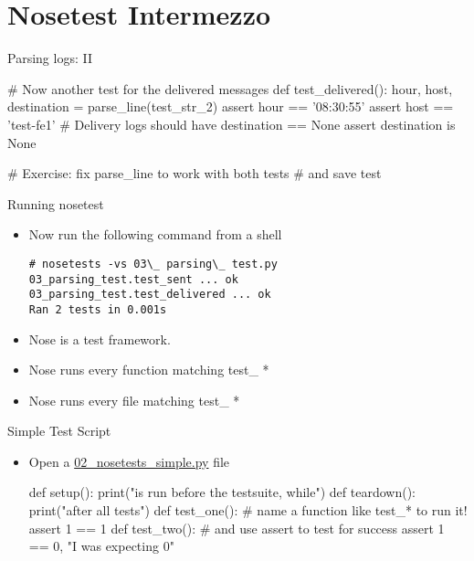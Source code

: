 \section{Nosetest Intermezzo}


\begin{pyframe}{Parsing logs: II}
\begin{pythoncode}
# Now another test for the delivered messages
def test_delivered():
    hour, host, destination = parse_line(test_str_2)
    assert hour == '08:30:55'
    assert host == 'test-fe1'
    # Delivery logs should have destination == None
    assert destination is None

# Exercise: fix parse_line to work with both tests
#  and save test
\end{pythoncode}
\end{pyframe}


\begin{pyframe}{Running nosetest}
\begin{itemize}
\item Now run the following command from a shell

\begin{verbatim}
# nosetests -vs 03\_ parsing\_ test.py  
03_parsing_test.test_sent ... ok        
03_parsing_test.test_delivered ... ok 
Ran 2 tests in 0.001s                 
\end{verbatim}
\item Nose is a test framework.
\item Nose runs every function matching test\_ *
\item Nose runs every file matching test\_ *
\end{itemize}
\end{pyframe}

\begin{pyframe}{Simple Test Script}
\begin{itemize}
\item Open a  \href{https://github.com/ioggstream/python-course/blob/master/python-for-sysadmin/02_nosetests_simple.py}{02\_nosetests\_simple.py} file
\begin{pythoncode}
def setup():
    print("is run before the testsuite, while")
def teardown():
    print("after all tests")
def test_one():
    # name a function like test_* to run it!
    assert 1 == 1 
def test_two():
    # and use assert to test for success
    assert 1 == 0, "I was expecting 0" 
\end{pythoncode}
\end{itemize}
\end{pyframe}

